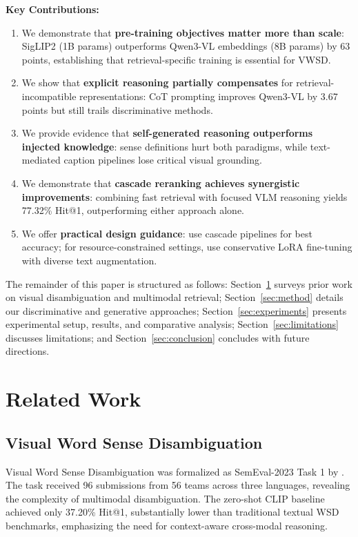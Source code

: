 \documentclass[11pt]{article}
\begin{document}
\noindent\textbf{Key Contributions:}
\begin{enumerate}
    \item We demonstrate that \textbf{pre-training objectives matter more than scale}: SigLIP2 (1B params) outperforms Qwen3-VL embeddings (8B params) by 63 points, establishing that retrieval-specific training is essential for VWSD.
    \item We show that \textbf{explicit reasoning partially compensates} for retrieval-incompatible representations: CoT prompting improves Qwen3-VL by 3.67 points but still trails discriminative methods.
    \item We provide evidence that \textbf{self-generated reasoning outperforms injected knowledge}: sense definitions hurt both paradigms, while text-mediated caption pipelines lose critical visual grounding.
    \item We demonstrate that \textbf{cascade reranking achieves synergistic improvements}: combining fast retrieval with focused VLM reasoning yields 77.32\% Hit@1, outperforming either approach alone.
    \item We offer \textbf{practical design guidance}: use cascade pipelines for best accuracy; for resource-constrained settings, use conservative LoRA fine-tuning with diverse text augmentation.
\end{enumerate}

The remainder of this paper is structured as follows: Section~\ref{sec:related} surveys prior work on visual disambiguation and multimodal retrieval; Section~\ref{sec:method} details our discriminative and generative approaches; Section~\ref{sec:experiments} presents experimental setup, results, and comparative analysis; Section~\ref{sec:limitations} discusses limitations; and Section~\ref{sec:conclusion} concludes with future directions.

\section{Related Work}
\label{sec:related}

\subsection{Visual Word Sense Disambiguation}

Visual Word Sense Disambiguation was formalized as SemEval-2023 Task 1 by \citet{raganato2023semeval}. The task received 96 submissions from 56 teams across three languages, revealing the complexity of multimodal disambiguation. The zero-shot CLIP baseline achieved only 37.20\% Hit@1, substantially lower than traditional textual WSD benchmarks, emphasizing the need for context-aware cross-modal reasoning.
\end{document}
